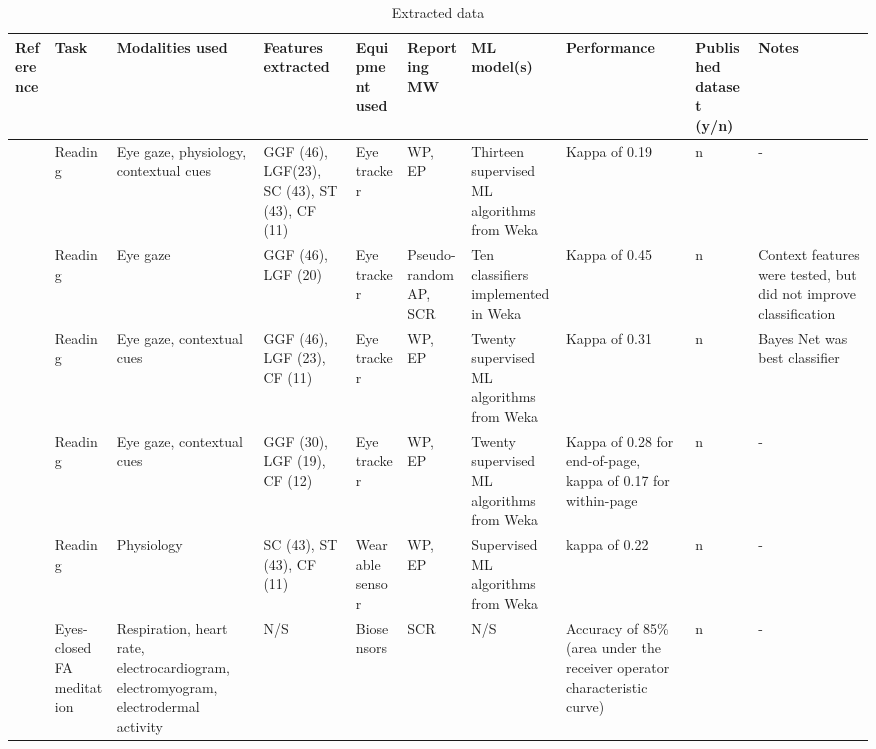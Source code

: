 \begin{sidewaystable} %
\begin{table}[H]
\centering
\caption{Extracted data}
\label{tab:data}
		\begin{tabulary}{\textheight}{LLLLLLLLLL}
		\toprule
Reference & Task & Modalities used & Features extracted & Equipment used & Reporting MW & ML model(s) & Performance & Published dataset (y/n) & Notes \\
		\midrule
\cite{Bixler2015AutomaticPhysiology}   &  Reading 	& Eye gaze, physiology, contextual cues & GGF (46), LGF(23), SC (43), ST (43), CF (11)  & Eye tracker   & WP, EP  &  Thirteen supervised ML algorithms from Weka        & Kappa of 0.19 & n & -\\
\cite{Bixler2015AutomaticAwareness}     &  Reading  & Eye gaze                              & GGF (46), LGF (20)                            & Eye tracker   & Pseudo-random AP, SCR  &  Ten classifiers implemented in Weka & Kappa of 0.45 & n & Context features were tested, but did not improve classification\\
\cite{Bixler2016AutomaticReading}       &  Reading 	& Eye gaze, contextual cues             & GGF (46), LGF (23), CF (11)                   & Eye tracker   & WP, EP & Twenty supervised ML algorithms from Weka            & Kappa of 0.31 & n & Bayes Net was best classifier\\
\cite{Bixler2014TowardWandering}        &  Reading  & Eye gaze, contextual cues             & GGF (30), LGF (19), CF (12)                   & Eye tracker   & WP, EP & Twenty supervised ML algorithms from Weka            & Kappa of 0.28 for end-of-page, kappa of 0.17 for within-page & n & -\\      
\cite{Blanchard2014AutomatedLearning}   &  Reading	& Physiology                                                                                            & SC (43), ST (43), CF (11)                                                          & Wearable sensor & WP, EP                                     & Supervised ML algorithms from Weka & kappa of 0.22 & n & -\\
\cite{Cheetham2016AutomatedApplication} &  Eyes-closed FA meditation  	& Respiration, heart rate, electrocardiogram, electromyogram, electrodermal activity & N/S                                                                               & Biosensors  &  SCR                                           & N/S & Accuracy of 85\% (area under the receiver operator characteristic curve) & n & -\\

\end{tabulary}
\end{table}
\end{sidewaystable}
